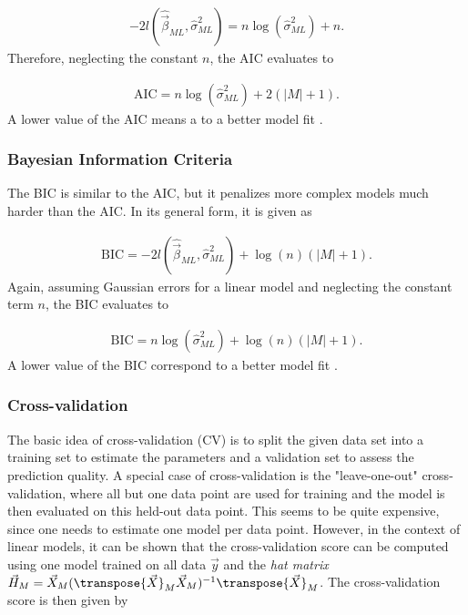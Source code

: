 \begin{align}
	-2l(\hat{\vec{\beta}}_{ML}, \hat \sigma_{ML}^2) = n \log(\hat \sigma_{ML}^2) + n.
\end{align}
%
Therefore, neglecting the constant $n$, the AIC evaluates to

\begin{align}
	\text{AIC} = n \log(\hat \sigma^2_{ML}) + 2(\vert M \vert + 1).
\end{align}
%
A lower value of the AIC means a to a better model fit \cite{fahrmeir2007regression}.

\subsubsection{Bayesian Information Criteria}

The BIC is similar to the AIC, but it penalizes more complex models much harder than the AIC. In its general form, it is given as 

\begin{align}
	\text{BIC} = -2l(\hat{\vec{\beta}}_{ML}, \hat \sigma^2_{ML}) + \log(n) (\vert M \vert + 1).
\end{align}
%
Again, assuming Gaussian errors for a linear model and neglecting the constant term $n$, the BIC evaluates to

\begin{align}
	\text{BIC} = n\log(\hat \sigma_{ML}^2) + \log(n)(\vert M\vert + 1).
\end{align}
%
A lower value of the BIC correspond to a better model fit \cite{fahrmeir2007regression}.

\subsubsection{Cross-validation} \label{subsubsec:Cross-validation}

The basic idea of cross-validation (CV) is to split the given data set into a training set to estimate the parameters and a validation set to assess the prediction quality. A special case of cross-validation is the "leave-one-out" cross-validation, where all but one data point are used for training and the model is then evaluated on this held-out data point. This seems to be quite expensive, since one needs to estimate one model per data point. However, in the context of linear models, it can be shown that the cross-validation score can be computed using one model trained on all data $\vec{y}$ and the \emph{hat matrix} $\vec{H}_M = \vec{X}_M (\transpose{\vec{X}}_M \vec{X}_M)^{-1} \transpose{\vec{X}}_M$. The cross-validation score is then given by

